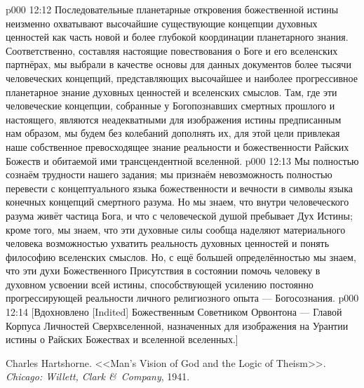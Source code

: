 \vs p000 12:12 Последовательные планетарные откровения божественной истины неизменно охватывают высочайшие существующие концепции духовных ценностей как часть новой и более глубокой координации планетарного знания. Соответственно, составляя настоящие повествования о Боге и его вселенских партнёрах, мы выбрали в качестве основы для данных документов более тысячи человеческих концепций, представляющих высочайшее и наиболее прогрессивное планетарное знание духовных ценностей и вселенских смыслов. Там, где эти человеческие концепции, собранные у Богопознавших смертных прошлого и настоящего, являются неадекватными для изображения истины предписанным нам образом, мы будем без колебаний дополнять их, для этой цели привлекая наше собственное превосходящее знание реальности и божественности Райских Божеств и обитаемой ими трансцендентной вселенной.
\vs p000 12:13 Мы полностью сознаём трудности нашего задания; мы признаём невозможность полностью перевести с концептуального языка божественности и вечности в символы языка конечных концепций смертного разума. Но мы знаем, что внутри человеческого разума живёт частица Бога, и что с человеческой душой пребывает Дух Истины; кроме того, мы знаем, что эти духовные силы сообща наделяют материального человека возможностью ухватить реальность духовных ценностей и понять философию вселенских смыслов. Но, с ещё большей определённостью мы знаем, что эти духи Божественного Присутствия в состоянии помочь человеку в духовном усвоении всей истины, способствующей усилению постоянно прогрессирующей реальности личного религиозного опыта --- Богосознания.
\vsetoff
\vs p000 12:14 [Вдохновлено [Indited] Божественным Советником Орвонтона --- Главой Корпуса Личностей Сверхвселенной, назначенных для изображения на Урантии истины о Райских Божествах и вселенной вселенных.]
\quizlink
\begin{thebibliography}{100}
Charles Hartshorne.
{<<Man's Vision of God and the Logic of Theism>>.}
{\em Chicago: Willett, Clark \&\ Company}, 1941.
\end{thebibliography}
